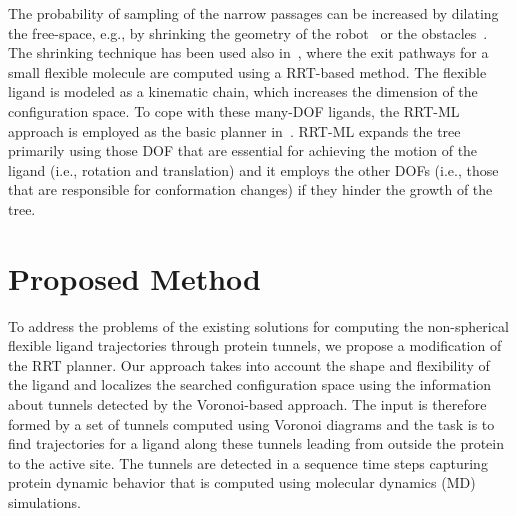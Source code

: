 \documentclass[usletter, 10pt, conference]{ieeeconf} %
\begin{document}
The probability of sampling of the narrow passages can be increased by dilating the free-space, e.g., by shrinking the geometry of 
the robot~\cite{hsuOnProb} or the obstacles~\cite{bayazitIRC}.
The shrinking technique has been used also in~\cite{cortes2010simulating}, where the exit pathways for a small flexible molecule are
computed using a RRT-based method.
The flexible ligand is modeled as a kinematic chain, which increases the dimension of the configuration space.
To cope with these many-DOF ligands, the RRT-ML~\cite{cortes2007mlrrt} approach is employed as the basic planner in~\cite{cortes2010simulating}.
RRT-ML expands the tree primarily using those DOF that are essential for achieving the motion of the ligand (i.e., rotation
and translation) and it employs the other DOFs (i.e., those that are responsible for conformation changes) if they hinder the growth of the tree.




\section{Proposed Method}
To address the problems of the existing solutions for computing the non-spherical flexible ligand trajectories through protein tunnels, we propose a modification of the RRT planner. 
Our approach takes into account the shape and flexibility of the ligand and localizes the searched configuration space using the information about tunnels detected by the Voronoi-based approach.
The input is therefore formed by a set of tunnels computed using Voronoi diagrams and the task is to find trajectories for a ligand along these tunnels
leading from outside the protein to the active site.
The tunnels are detected in a sequence time steps capturing protein dynamic behavior that is computed using molecular dynamics (MD) simulations. 
\end{document}
